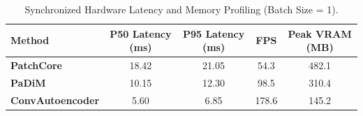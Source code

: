 \begin{table}[h]
\centering
\caption{Synchronized Hardware Latency and Memory Profiling (Batch Size = 1).}
\label{tab:deployment_profiling}
\begin{tabular}{lcccc}
\toprule
\textbf{Method} & \textbf{P50 Latency (ms)} & \textbf{P95 Latency (ms)} & \textbf{FPS} & \textbf{Peak VRAM (MB)} \\
\midrule
\textbf{PatchCore} & 18.42 & 21.05 & 54.3 & 482.1 \\
\textbf{PaDiM} & 10.15 & 12.30 & 98.5 & 310.4 \\
\textbf{ConvAutoencoder} & 5.60 & 6.85 & 178.6 & 145.2 \\
\bottomrule
\end{tabular}
\end{table}